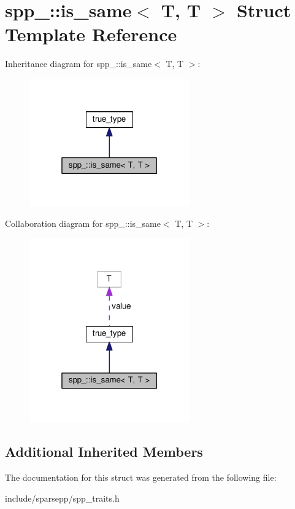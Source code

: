 \hypertarget{structspp___1_1is__same_3_01_t_00_01_t_01_4}{}\section{spp\+\_\+\+:\+:is\+\_\+same$<$ T, T $>$ Struct Template Reference}
\label{structspp___1_1is__same_3_01_t_00_01_t_01_4}


Inheritance diagram for spp\+\_\+\+:\+:is\+\_\+same$<$ T, T $>$\+:\nopagebreak
\begin{figure}[H]
\begin{center}
\leavevmode
\includegraphics[width=196pt]{structspp___1_1is__same_3_01_t_00_01_t_01_4__inherit__graph}
\end{center}
\end{figure}


Collaboration diagram for spp\+\_\+\+:\+:is\+\_\+same$<$ T, T $>$\+:\nopagebreak
\begin{figure}[H]
\begin{center}
\leavevmode
\includegraphics[width=196pt]{structspp___1_1is__same_3_01_t_00_01_t_01_4__coll__graph}
\end{center}
\end{figure}
\subsection*{Additional Inherited Members}


The documentation for this struct was generated from the following file\+:\begin{DoxyCompactItemize}
\item 
include/sparsepp/spp\+\_\+traits.\+h\end{DoxyCompactItemize}
